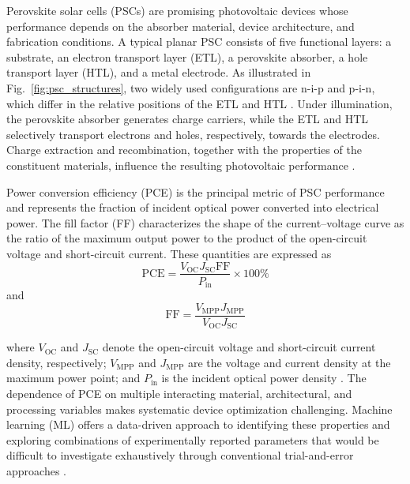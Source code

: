 \documentclass[3p]{elsarticle}
\begin{document}
Perovskite solar cells (PSCs) are promising photovoltaic devices whose performance depends on the absorber material, device architecture, and fabrication conditions. A typical planar PSC consists of five functional layers: a substrate, an electron transport layer (ETL), a perovskite absorber, a hole transport layer (HTL), and a metal electrode. As illustrated in Fig.~\ref{fig:psc_structures}, two widely used configurations are n-i-p and p-i-n, which differ in the relative positions of the ETL and HTL \cite{jung2015perovskite,zuo2016advances}. Under illumination, the perovskite absorber generates charge carriers, while the ETL and HTL selectively transport electrons and holes, respectively, towards the electrodes. Charge extraction and recombination, together with the properties of the constituent materials, influence the resulting photovoltaic performance \cite{jung2015perovskite,zuo2016advances}.

Power conversion efficiency (PCE) is the principal metric of PSC performance and represents the fraction of incident optical power converted into electrical power. The fill factor (FF) characterizes the shape of the current--voltage curve as the ratio of the maximum output power to the product of the open-circuit voltage and short-circuit current. These quantities are expressed as\\
\begin{equation}
    \mathrm{PCE} =
    \frac{V_{\mathrm{OC}}J_{\mathrm{SC}}\mathrm{FF}}{P_{\mathrm{in}}} \times 100\%
\end{equation}
and
\begin{equation}
    \mathrm{FF} = \frac{V_{\mathrm{MPP}}J_{\mathrm{MPP}}}{V_{\mathrm{OC}}J_{\mathrm{SC}}}
\end{equation}

where $V_{\mathrm{OC}}$ and $J_{\mathrm{SC}}$ denote the open-circuit voltage and short-circuit current density, respectively; $V_{\mathrm{MPP}}$ and $J_{\mathrm{MPP}}$ are the voltage and current density at the maximum power point; and $P_{\mathrm{in}}$ is the incident optical power density \cite{zuo2016advances}. The dependence of PCE on multiple interacting material, architectural, and processing variables makes systematic device optimization challenging. Machine learning (ML) offers a data-driven approach to identifying these properties and exploring combinations of experimentally reported parameters that would be difficult to investigate exhaustively through conventional trial-and-error approaches \cite{odabasi2019performance,bansal2023machine,li2019predictions,liu2022machine,gok2022predicting}.
\end{document}
